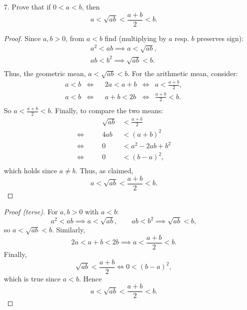\documentclass[11pt]{article}
\begin{document}
\begin{enumerate}
    \item[7.] Prove that if $0 < a < b$, then
          \[
              a < \sqrt{ab} < \frac{a + b}{2} < b.
          \]
          \begin{proof}
              Since $a, b > 0$, from $a < b$ find (multiplying by $a$ resp. $b$ preserves sign):
              \[
                  \begin{aligned}
                      a^2 < ab \implies a < \sqrt{ab}, \\
                      ab < b^2 \implies \sqrt{ab} < b. \\
                  \end{aligned}
              \]
              Thus, the geometric mean, $a < \sqrt{ab} < b$.  For the arithmetic mean,
              consider:
              \[
                  \begin{alignedat}{3}
                      a < b & \iff &  & 2a < a + b & \iff & a < \frac{a + b}{2}, \\
                      a < b & \iff &  & a + b < 2b & \iff & \frac{a + b}{2} < b. \\
                  \end{alignedat}
              \]
              So $a < \tfrac{a + b}{2} < b$.  Finally, to compare the two means:
              \[
                  \begin{alignedat}{3}
                                 &  & \sqrt{ab} & < \frac{a + b}{2} \\
                      \iff \quad &  & 4ab       & < (a + b)^2       \\
                      \iff \quad &  & 0         & < a^2 - 2ab + b^2 \\
                      \iff \quad &  & 0         & < (b - a)^2,      \\
                  \end{alignedat}
              \]
              which holds since $a \neq b$.  Thus, as claimed,
              \[
                  a < \sqrt{ab} < \frac{a + b}{2} < b.
              \]
          \end{proof}

          \begin{proof}[Proof (terse)]
              For $a,b > 0$ with $a < b$:
              \[
                  a^2 < ab \implies a < \sqrt{ab},
                  \qquad
                  ab < b^2 \implies \sqrt{ab} < b,
              \]
              so $a < \sqrt{ab} < b$. Similarly,
              \[
                  2a < a + b < 2b \implies a < \frac{a+b}{2} < b.
              \]
              Finally,
              \[
                  \sqrt{ab} < \frac{a+b}{2}
                  \iff 0 < (b-a)^2,
              \]
              which is true since $a < b$. Hence
              \[
                  a < \sqrt{ab} < \frac{a+b}{2} < b.
              \]
          \end{proof}


\end{enumerate}
\end{document}
